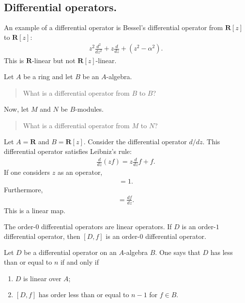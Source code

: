 \documentclass [11 pt, oneside] {article}
\begin{document}
\subsection{Differential operators.}
An example of a differential operator is Bessel's differential operator from $\mathbf{R}[z]$ to $\mathbf{R}[z]$:
\begin{align*}
	z^2 \frac{d^2}{dz^2} + z\frac{d}{dz}+(z^2-\alpha^2).
\end{align*}
This is $\mathbf{R}$-linear but not $\mathbf{R}[z]$-linear.

Let $A$ be a ring and let $B$ be an $A$-algebra. 
\begin{quote}
	\small What is a differential operator from $B$ to $B$?
\end{quote}
Now, let $M$ and $N$ be $B$-modules.
\begin{quote}
	\small What is a differential operator from $M$ to $N$?
\end{quote}

\begin{example}[ ]\label{}\text{}
Let $A=\mathbf{R}$ and $B=\mathbf{R}[z]$. Consider the differential operator $d/dz$.
This differential operator satisfies Leibniz's rule:
\begin{align*}
	\frac{d}{dz}(zf) = z \frac{d}{dz}f + f.
\end{align*}
If one considers $z$ as an operator,
\begin{align*}
	[d/dz,z]=1.
\end{align*}
Furthermore,
\begin{align*}
	[d/dz,f] = \frac{df}{dz}.
\end{align*}
This is a linear map.
\end{example}

The order-$0$ differential operators are linear operators.
If $D$ is an order-$1$ differential operator, then $[D,f]$ is an order-$0$ differential operator.

\begin{definition}[ ]\label{}\text{}
Let $D$ be a differential operator on an $A$-algebra $B$. One says that $D$ has  less than or equal to $n$ if and only if
\begin{enumerate}
	\item $D$ is linear over $A$;
	\item $[D,f]$ has order less than or equal to $n-1$ for $f\in B$.
\end{enumerate}
\end{definition}
\end{document}
